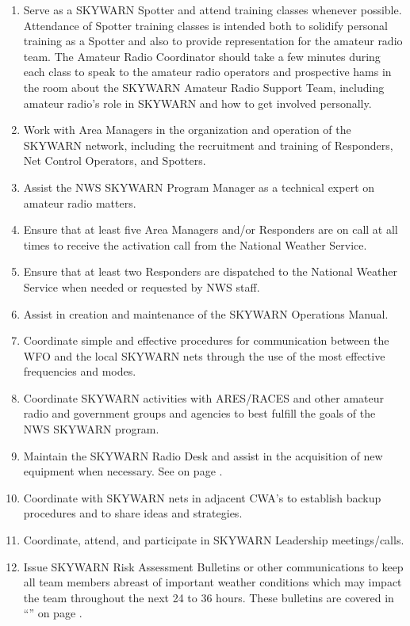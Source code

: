 \documentclass[pdflatex,letterpaper,twoside,12pt]{book}
\begin{document}
\begin{enumerate}
\item Serve as a SKYWARN Spotter and attend training classes whenever possible.  Attendance of Spotter training classes is intended both to solidify personal training as a Spotter and also to provide representation for the amateur radio team.  The Amateur Radio Coordinator should take a few minutes during each class to speak to the amateur radio operators and prospective hams in the room about the SKYWARN Amateur Radio Support Team, including amateur radio's role in SKYWARN and how to get involved personally.
\item Work with Area Managers in the organization and operation of the SKYWARN network, including the recruitment and training of Responders, Net Control Operators, and Spotters.
\item Assist the NWS SKYWARN Program Manager as a technical expert on amateur radio matters.
\item Ensure that at least five Area Managers and/or Responders are on call at all times to receive the activation call from the National Weather Service.
\item Ensure that at least two Responders are dispatched to the National Weather Service when needed or requested by NWS staff.
\item Assist in creation and maintenance of the SKYWARN Operations Manual.
\item Coordinate simple and effective procedures for communication between the WFO and the local SKYWARN nets through the use of the most effective frequencies and modes.
\item Coordinate SKYWARN activities with ARES/RACES and other amateur radio and government groups and agencies to best fulfill the goals of the NWS SKYWARN program.
\item Maintain the SKYWARN Radio Desk and assist in the acquisition of new equipment when necessary.  See  on page \pageref{wx4akq-maint}.
\item Coordinate with SKYWARN nets in adjacent CWA's to establish backup procedures and to share ideas and strategies.
\item Coordinate, attend, and participate in SKYWARN Leadership meetings/calls.
\item Issue SKYWARN Risk Assessment Bulletins or other communications to keep all team members abreast of important weather conditions which may impact the team throughout the next 24 to 36 hours.  These bulletins are covered in ``'' on page \pageref{risk-assessments}.
\end{enumerate}
\end{document}
